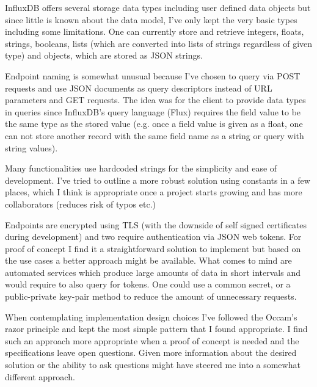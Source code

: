 \documentclass[twocolumn]{article}
\begin{document}
InfluxDB offers several storage data types including user defined data objects but since little is known about the data model, I've only kept the very basic types including some limitations. One can currently store and retrieve integers, floats, strings, booleans, lists (which are converted into lists of strings regardless of given type) and objects, which are stored as JSON strings. 

Endpoint naming is somewhat unusual because I've chosen to query via POST requests and use JSON documents as query descriptors instead of URL parameters and GET requests. The idea was for the client to provide data types in queries since InfluxDB's query language (Flux) requires the field value to be the same type as the stored value (e.g. once a field value is given as a float, one can not store another record with the same field name as a string or query with string values).

Many functionalities use hardcoded strings for the simplicity and ease of development. I've tried to outline a more robust solution using constants in a few places, which I think is appropriate once a project starts growing and has more collaborators (reduces risk of typos etc.)

Endpoints are encrypted using TLS (with the downside of self signed certificates during development) and two require authentication via JSON web tokens. For proof of concept I find it a straightforward solution to implement but based on the use cases a better approach might be available. What comes to mind are automated services which produce large amounts of data in short intervals and would require to also query for tokens. One could use a common secret, or a public-private key-pair method to reduce the amount of unnecessary requests.

When contemplating implementation design choices I've followed the Occam's razor principle and kept the most simple pattern that I found appropriate. I find such an approach more appropriate when a proof of concept is needed and the specifications leave open questions. Given more information about the desired solution or the ability to ask questions might have steered me into a somewhat different approach.
\end{document}
